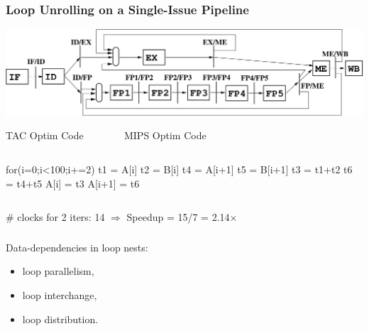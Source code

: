 \documentclass[rgb,dvipsnames]{beamer}
\renewcommand{\emph}[1]{\textcolor{structure}{#1}}
\newcommand{\emp}[1]{\textcolor{DikuRed}{ #1}}
\begin{document}
\begin{frame}[fragile,t]
    \frametitle{Loop Unrolling on a Single-Issue Pipeline}

\includegraphics[width=50ex]{figures/SimpleOoOPipeline}

\begin{block}{TAC Optim Code{\tt~~~~~~~~}MIPS Optim Code}
\begin{columns}
\begin{colorcode}[fontsize=\scriptsize]
for(i=0;i<100;i+=2)
  t1 = \emph{A[i]}
  t2 = \emph{B[i]}
  t4 = \emph{A[i+1]}
  t5 = \emph{B[i+1]}
  t3 = t1+t2
  t6 = t4+t5
  \emp{A[i]} = t3
  \emp{A[i+1]} = t6
\end{colorcode}
\end{columns}
\end{block}
\smallskip 

\# clocks for 2 iters: 14 $\Rightarrow$ Speedup = 15/7 = 2.14$\times$

\end{frame}

\begin{frame}[fragile,t]
  \frametitle{}

\huge{\center
Data-dependencies in loop nests:
            \begin{itemize}
                \item loop parallelism,
                \item loop interchange,
                \item loop distribution.
            \end{itemize}
}
\end{frame}
\end{document}
